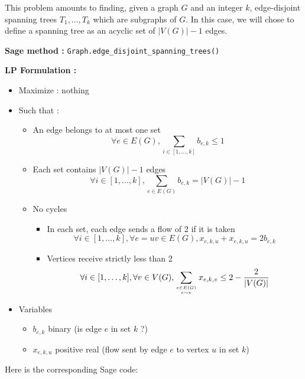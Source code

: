 This problem amounts to finding, given a graph $G$ and an integer $k$, edge-disjoint spanning trees $T_1, \dots, T_k$ which are subgraphs of $G$. In this case, we will chose to define a spanning tree as an acyclic set of $|V(G)|-1$ edges.

{\bf Sage method : }\verb!Graph.edge_disjoint_spanning_trees()!

{\bf LP Formulation :}
\begin{itemize}
\item Maximize : nothing
\item Such that :
  \begin{itemize}
  \item An edge belongs to at most one set
    $$\forall e\in E(G), \sum_{i\in [1,\dots,k]} b_{e,k} \leq 1$$
  \item Each set contains $|V(G)|-1$ edges
    $$\forall i\in [1,\dots,k], \sum_{e\in E(G)} b_{e,k} = |V(G)|-1$$
  \item No cycles
    \begin{itemize}
    \item In each set, each edge sends a flow of 2 if it is taken
      $$\forall i\in [1,\dots,k], \forall e=uv\in E(G), x_{e,k,u} + x_{e,k,u} = 2b_{e,k}$$
    \item Vertices receive strictly less than 2
      $$\forall i\in [1,\dots,k], \forall v\in V(G), \sum_{e\in E(G)\atop e\sim v}x_{e,k,v}\leq 2-\frac 2 {|V(G)|}$$
    \end{itemize}
  \end{itemize}
\item Variables
  \begin{itemize}
  \item $b_{e,k}$ binary (is edge $e$ in set $k$ ?)
  \item $ x_{e,k,u}$ positive real (flow sent by edge $e$ to vertex $u$ in set $k$)
  \end{itemize}
\end{itemize}

Here is the corresponding Sage code:

